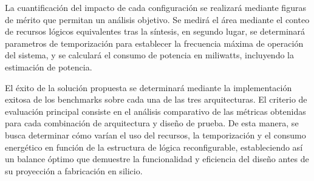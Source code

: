 La cuantificación del impacto de cada configuración se realizará mediante figuras de mérito 
que permitan un análisis objetivo. Se medirá el área mediante el conteo de recursos lógicos equivalentes tras la síntesis, en segundo lugar, se 
determinará parametros de temporización para establecer la frecuencia 
máxima de operación del sistema, y se calculará el consumo de potencia en miliwatts, 
incluyendo la estimación de potencia.

El éxito de la solución propuesta se determinará mediante la implementación exitosa de los 
benchmarks sobre cada una de las tres arquitecturas. El criterio de evaluación principal 
consiste en el análisis comparativo de las métricas obtenidas para cada combinación de 
arquitectura y diseño de prueba. De esta manera, se busca determinar cómo varían el uso del 
recursos, la temporización y el consumo energético en función de la estructura de lógica reconfigurable, 
estableciendo así un balance óptimo que demuestre la funcionalidad y eficiencia del diseño 
antes de su proyección a fabricación en silicio.
